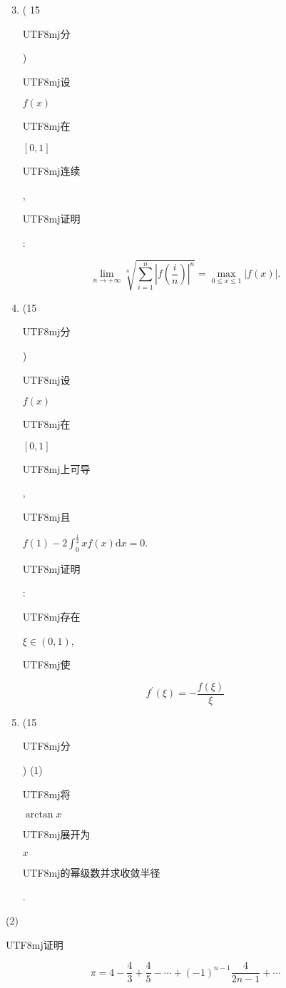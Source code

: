 \documentclass[10pt]{article}
\begin{document}
\begin{enumerate}
  \setcounter{enumi}{2}
  \item ( 15 \begin{CJK}{UTF8}{mj}分\end{CJK}) \begin{CJK}{UTF8}{mj}设\end{CJK} $f(x)$ \begin{CJK}{UTF8}{mj}在\end{CJK} $[0,1]$ \begin{CJK}{UTF8}{mj}连续\end{CJK}, \begin{CJK}{UTF8}{mj}证明\end{CJK}:
\end{enumerate}
$$
\lim _{n \rightarrow+\infty} \sqrt[n]{\sum_{i=1}^{n}\left|f\left(\frac{i}{n}\right)\right|^{n}}=\max _{0 \leq x \leq 1}|f(x)| .
$$

\begin{enumerate}
  \setcounter{enumi}{3}
  \item (15 \begin{CJK}{UTF8}{mj}分\end{CJK}) \begin{CJK}{UTF8}{mj}设\end{CJK} $f(x)$ \begin{CJK}{UTF8}{mj}在\end{CJK} $[0,1]$ \begin{CJK}{UTF8}{mj}上可导\end{CJK}, \begin{CJK}{UTF8}{mj}且\end{CJK} $f(1)-2 \int_{0}^{\frac{1}{2}} x f(x) \mathrm{d} x=0$. \begin{CJK}{UTF8}{mj}证明\end{CJK}: \begin{CJK}{UTF8}{mj}存在\end{CJK} $\xi \in(0,1)$, \begin{CJK}{UTF8}{mj}使\end{CJK}
\end{enumerate}
$$
f^{\prime}(\xi)=-\frac{f(\xi)}{\xi}
$$

\begin{enumerate}
  \setcounter{enumi}{4}
  \item (15 \begin{CJK}{UTF8}{mj}分\end{CJK}) (1) \begin{CJK}{UTF8}{mj}将\end{CJK} $\arctan x$ \begin{CJK}{UTF8}{mj}展开为\end{CJK} $x$ \begin{CJK}{UTF8}{mj}的幂级数并求收敛半径\end{CJK}.
\end{enumerate}
(2) \begin{CJK}{UTF8}{mj}证明\end{CJK}
$$
\pi=4-\frac{4}{3}+\frac{4}{5}-\cdots+(-1)^{n-1} \frac{4}{2 n-1}+\cdots
$$
\end{document}
